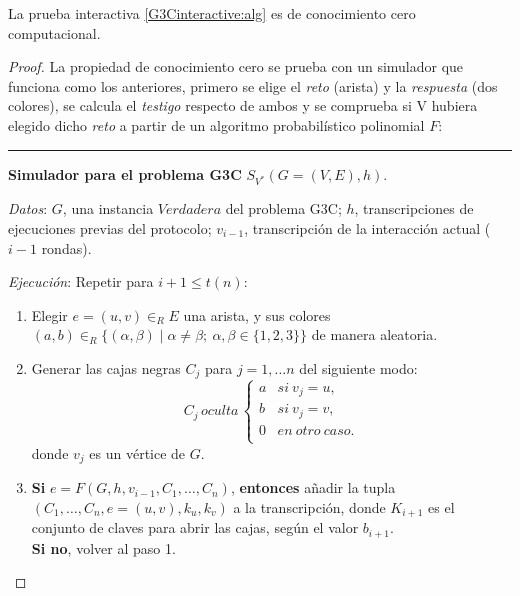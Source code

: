 \hfil

\begin{theorem}
	La prueba interactiva \ref{G3Cinteractive:alg} es de conocimiento cero computacional.
\end{theorem}

\begin{proof}
	La propiedad de conocimiento cero se prueba con un simulador que funciona como los anteriores, primero se elige el \textit{reto} (arista) y la \textit{respuesta} (dos colores), se calcula el \textit{testigo} respecto de ambos y se comprueba si V hubiera elegido dicho \textit{reto} a partir de un algoritmo probabilístico polinomial $F$:
	
	
	\hfil 
	
	\rule{\textwidth}{1pt}
	
	\textbf{Simulador para el problema G3C} $S_{V^*}(G=(V,E), h)$.
	
	\hfil
	
	\textit{Datos}: \quad $G$, una instancia $Verdadera$ del problema G3C; $h$, transcripciones de ejecuciones previas del protocolo; $v_{i-1}$, transcripción de la interacción actual ($i-1$ rondas).
	
	\textit{Ejecución}: Repetir para $i+1 \leq t(n)$:
	
	\begin{enumerate}
		\item Elegir $e=(u,v)\in_R E$ una arista, y sus colores $(a,b)\in_R \{ (\alpha,\beta) \mid \alpha \neq \beta ;\ \alpha,\beta \in \{1,2,3\}  \}$ de manera aleatoria.
		
		\item Generar las cajas negras $C_j$ para $j=1,\dots n$ del siguiente modo:
		\[
		C_j \, oculta \, \begin{cases}
		a & si\ v_j=u,\\
		b & si\ v_j=v,\\
		0 & en\ otro\ caso.\\
		\end{cases}
		\] donde $v_j$ es un vértice de $G$.
		
		
		\item \textbf{Si} $e = F(G,h,v_{i-1},C_1, \dots, C_{n})$, \textbf{entonces} añadir la tupla \\ 
		$(C_1, \dots, C_{n},e=(u,v),k_u,k_v)$ a la transcripción, donde $K_{i+1}$ es el conjunto de claves para abrir las cajas, según el valor $b_{i+1}$. \\
		\textbf{Si no}, volver al paso 1.
		

\end{enumerate}
\end{proof}
